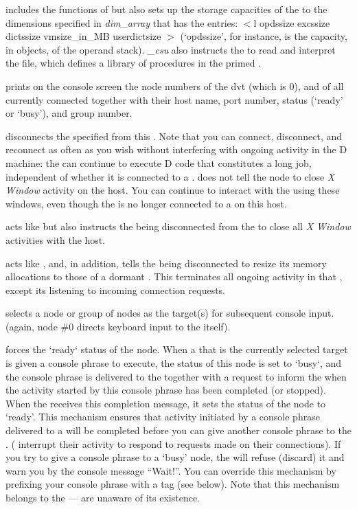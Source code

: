  includes the functions of  but also sets up the
storage capacities of the  to the dimensions specified in
\emph{dim\_array} that has the entries: $<$l opdssize excssize
dictssize vmsize\_in\_MB userdictsize $>$ (`opdssize', for instance,
is the capacity, in objects, of the  operand
stack). \emph{\_csu} also instructs the  to read and
interpret the  file, which defines a library of
procedures in the primed .

 prints on the  console screen the node numbers of
the dvt (which is $0$), and of all currently connected 
together with their host name, port number, status (`ready' or
`busy'), and group number.

 disconnects the specified  from this
. Note that you can connect, disconnect, and reconnect
 as often as you wish without interfering with ongoing
activity in the  D machine: the  can
continue to execute D code that constitutes a long job, independent of
whether it is connected to a .  does not tell the
node to close \emph{X Window} activity on the  host. You can
continue to interact with the  using these windows, even
though the  is no longer connected to a  on this
host.

 acts like  but also instructs the 
being disconnected from the  to close all \emph{X Window}
activities with the  host.

 acts like , and, in addition, tells the
 being disconnected to resize its memory allocations to
those of a dormant . This terminates all ongoing activity
in that , except its listening to incoming connection
requests.

 selects a node or group of nodes as the target(s) for
subsequent console input. (again, node \#$0$ directs keyboard input to
the  itself).

 forces the `ready` status of the node. When a 
that is the currently selected target is given a console phrase to
execute, the status of this node is set to `busy`, and the console
phrase is delivered to the  together with a request to
inform the  when the activity started by this console phrase
has been completed (or stopped). When the  receives this
completion message, it sets the status of the node to `ready'. This
mechanism ensures that activity initiated by a console phrase
delivered to a  will be completed before you can give
another console phrase to the . ( interrupt
their activity to respond to requests made on their connections). If
you try to give a console phrase to a `busy' node, the  will
refuse (discard) it and warn you by the console message ``Wait!''. You
can override this mechanism by prefixing your console phrase with a
tag (see below). Note that this mechanism belongs to the 
---  are unaware of its existence.

